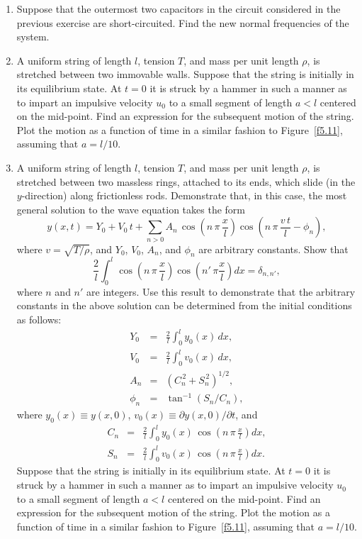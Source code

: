 {\begin{enumerate}
\item Suppose that the outermost two capacitors in the circuit considered in the previous exercise  are short-circuited. Find the new normal frequencies of the system.

\item A uniform string of length $l$, tension $T$, and mass per unit length
$\rho$, is stretched between two immovable walls. Suppose that the string is
initially in its equilibrium state. At $t=0$ it is
struck by a hammer in such a manner as to impart an impulsive
velocity $u_0$ to a small segment of length $a<l$ centered on the mid-point.
Find an expression for the subsequent motion of the string. Plot the motion
as a function of time  in a similar fashion to Figure~\ref{f5.11}, assuming that
$a=l/10$. 

\item A uniform string of length $l$, tension $T$, and mass per unit length
$\rho$, is stretched between two massless rings, attached to its ends, which
slide (in the $y$-direction) along frictionless rods.  Demonstrate that, in this case,
the most general solution to the wave equation takes the form
$$
y(x,t) = Y_0 + V_0\,t + \sum_{n>0} A_n\,\cos\left(n\,\pi\,\frac{x}{l}\right)\cos\left(n\,\pi\,\frac{v\,t}{l}-\phi_n\right),
$$
where $v=\sqrt{T/\rho}$, and $Y_0$, $V_0$, $A_n$, and $\phi_n$ are arbitrary constants. 
Show that
$$
\frac{2}{l}\int_0^l\cos\left(n\,\pi\,\frac{x}{l}\right)\cos\left(n'\,\pi\frac{x}{l}\right)dx=\delta_{n,n'},
$$
where $n$ and $n'$ are integers. Use this result to demonstrate that the arbitrary
constants in the above solution can be determined from the initial conditions 
as follows:
\begin{eqnarray}
Y_0 &=&\frac{2}{l}\int_0^l y_0(x)\,dx,\nonumber\\[0.5ex]
V_0 &=&\frac{2}{l}\int_0^l v_0(x)\,dx,\nonumber\\[0.5ex]
A_n &=& (C_n^{\,2}+S_n^{\,2})^{1/2},\nonumber\\[0.5ex]
\phi_n &=&\tan^{-1}(S_n/C_n),\nonumber
\end{eqnarray}
where $y_0(x)\equiv y(x,0)$, $v_0(x)\equiv \partial y(x,0)/\partial t$, and
\begin{eqnarray}
C_n&=& \frac{2}{l}\int_0^l y_0(x)\,\cos\left(n\,\pi\,\frac{x}{l}\right) dx,\nonumber\\[0.5ex]
S_n &=&  \frac{2}{l}\int_0^l v_0(x)\,\cos\left(n\,\pi\,\frac{x}{l}\right) dx.\nonumber
\end{eqnarray}
Suppose that the string is
initially in its equilibrium state. At $t=0$ it is
struck by a hammer in such a manner as to impart an impulsive
velocity $u_0$ to a small segment of length $a<l$ centered on the mid-point.
Find an expression for the subsequent motion of the string. Plot the motion
as a function of time  in a similar fashion to Figure~\ref{f5.11}, assuming that
$a=l/10$. 


\end{enumerate}}
